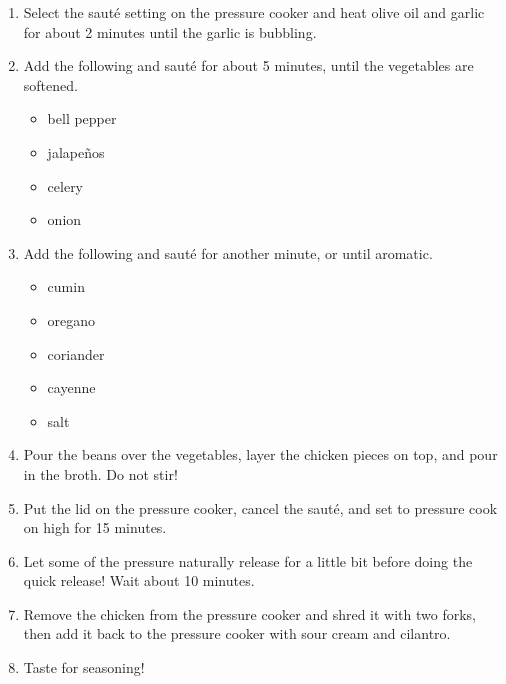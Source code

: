 \begin{enumerate}
\item Select the saut\'e setting on the pressure cooker and heat olive oil and garlic for about 2 minutes until the
    garlic is bubbling.
\item Add the following and saut\'e for about 5 minutes, until the vegetables are softened.
\begin{itemize}
    \item bell pepper
    \item jalape\~{n}os
    \item celery
    \item onion
\end{itemize}
\item Add the following and saut\'e for another minute, or until aromatic.
\begin{itemize}
    \item cumin
    \item oregano
    \item coriander
    \item cayenne
    \item salt
\end{itemize}
\item Pour the beans over the vegetables, layer the chicken pieces on top, and pour in the broth. Do not stir!
\item Put the lid on the pressure cooker, cancel the saut\'e, and set to pressure cook on high for 15 minutes.
\item Let some of the pressure naturally release for a little bit before doing the quick release! Wait about 10 minutes.
\item Remove the chicken from the pressure cooker and shred it with two forks, then add it back to the pressure cooker
    with sour cream and cilantro.
\item Taste for seasoning!
\end{enumerate}
